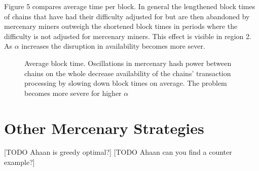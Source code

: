 \documentclass[10pt, preprint]{aastex}
\begin{document}
Figure 5 compares average time per block.  In general the lengthened block times of chains that have had their difficulty adjusted for but are then abandoned by mercenary miners outweigh the shortened block times in periods where the difficulty is not adjusted for mercenary miners.  This effect is visible in region 2.  As $\alpha$ increases the disruption in availability becomes more sever.
\begin{figure}
	\centering
	\qquad
	\qquad
	\caption{Average block time.  Oscillations in mercenary hash power between chains on the whole decrease availability of the chains' transaction processing by slowing down block times on average.  The problem becomes more severe for higher $\alpha$}
\end{figure}


\section{Other Mercenary Strategies}
[TODO Ahaan is greedy optimal?]
[TODO Ahaan can you find a counter example?]
\end{document}
